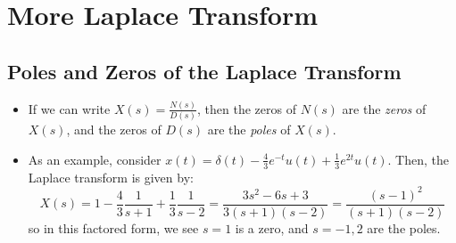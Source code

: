 \section{More Laplace Transform}

\subsection{Poles and Zeros of the Laplace Transform}
\begin{itemize}
	\item If we can write \( X(s) = \frac{N(s)}{D(s)} \), then the zeros of \( N(s) \) are the \textit{zeros}
		of \( X(s) \), and the zeros of \( D(s) \) are the \textit{poles} of \( X(s) \).
	\item As an example, consider \( x(t) = \delta(t) - \frac{4}{3} e^{-t} u(t) + \frac{1}{3}e^{2t}u(t)\). Then, 
		the Laplace transform is given by:
		\[
		X(s) = 1 - \frac{4}{3}\frac{1}{s + 1} + \frac{1}{3}\frac{1}{s-2} = \frac{3s^2 - 6s + 3}{3(s+1)(s-2)}
		= \frac{(s - 1)^2}{(s + 1)(s - 2)}
		\] 
		so in this factored form, we see \( s = 1 \) is a zero, and \( s = -1, 2 \) are the poles.    
\end{itemize}
